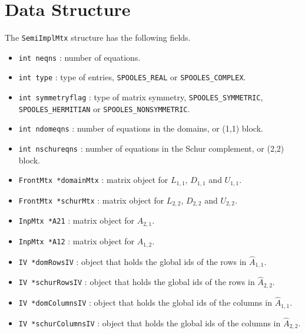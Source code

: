 \par
\section{Data Structure}
\label{section:SemiImplMtx:dataStructure}
\par
\par
The {\tt SemiImplMtx} structure has the following fields.
\begin{itemize}
\item
{\tt int neqns} : number of equations.
\item
{\tt int type} : type of entries, {\tt SPOOLES\_REAL} or
{\tt SPOOLES\_COMPLEX}.
\item
{\tt int symmetryflag} : type of matrix symmetry, 
{\tt SPOOLES\_SYMMETRIC}, {\tt SPOOLES\_HERMITIAN} or
{\tt SPOOLES\_NONSYMMETRIC}.
\item
{\tt int ndomeqns} : number of equations in the domains,
or (1,1) block.
\item
{\tt int nschureqns} : number of equations in the Schur complement,
or (2,2) block.
\item
{\tt FrontMtx *domainMtx} : matrix object for 
$L_{1,1}$, $D_{1,1}$ and $U_{1,1}$.
\item
{\tt FrontMtx *schurMtx} : matrix object for 
$L_{2,2}$, $D_{2,2}$ and $U_{2,2}$.
\item
{\tt InpMtx *A21} : matrix object for ${\widehat A}_{2,1}$.
\item
{\tt InpMtx *A12} : matrix object for ${\widehat A}_{1,2}$.
\item
{\tt IV *domRowsIV} : object that holds the global ids of the rows
in ${\widehat A}_{1,1}$.
\item
{\tt IV *schurRowsIV} : object that holds the global ids of the rows
in ${\widehat A}_{2,2}$.
\item
{\tt IV *domColumnsIV} : object that holds the global ids of the 
columns in ${\widehat A}_{1,1}$.
\item
{\tt IV *schurColumnsIV} : object that holds the global ids of the 
columns in ${\widehat A}_{2,2}$.
\end{itemize}
\par
